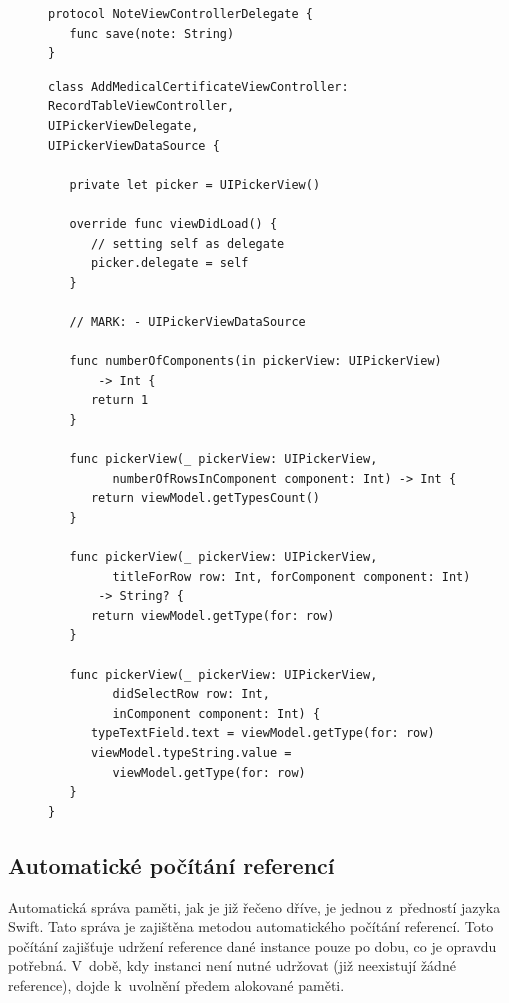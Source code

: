 \documentclass[thesis=M,czech]{FITthesis}[2012/06/26]
\begin{document}
\begin{figure}
\begin{minipage}{\linewidth}
\begin{lstlisting}[caption={Definice protokolu},label={lst:protocol}]
protocol NoteViewControllerDelegate {
   func save(note: String)
}
\end{lstlisting}
\end{minipage}
\end{figure}	

\begin{figure}
\begin{minipage}{\linewidth}
\begin{lstlisting}[caption={Implementace protokolu},label={lst:pickerdelegate}]
class AddMedicalCertificateViewController: 
RecordTableViewController, 
UIPickerViewDelegate, 
UIPickerViewDataSource {

   private let picker = UIPickerView()

   override func viewDidLoad() {
      // setting self as delegate
      picker.delegate = self
   }

   // MARK: - UIPickerViewDataSource

   func numberOfComponents(in pickerView: UIPickerView) 
       -> Int {
      return 1
   }

   func pickerView(_ pickerView: UIPickerView, 
         numberOfRowsInComponent component: Int) -> Int {
      return viewModel.getTypesCount()
   }

   func pickerView(_ pickerView: UIPickerView, 
         titleForRow row: Int, forComponent component: Int)
       -> String? {
      return viewModel.getType(for: row)
   }

   func pickerView(_ pickerView: UIPickerView, 
         didSelectRow row: Int, 
         inComponent component: Int) {
      typeTextField.text = viewModel.getType(for: row)
      viewModel.typeString.value = 
         viewModel.getType(for: row)
   }
}
\end{lstlisting}
\end{minipage}
\end{figure}	
	
\subsection{Automatické počítání referencí}
Automatická správa paměti, jak je již řečeno dříve, je jednou z~předností jazyka Swift. Tato správa je zajištěna metodou automatického počítání referencí. Toto počítání zajišťuje udržení reference dané instance pouze po dobu, co je opravdu potřebná. V~době, kdy instanci není nutné udržovat (již neexistují žádné reference), dojde k~uvolnění předem alokované paměti.
\end{document}
